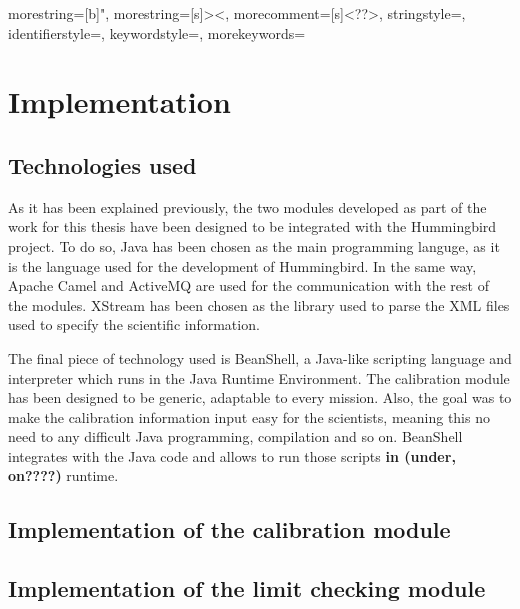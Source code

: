 


{
  morestring=[b]",
  morestring=[s]{>}{<},
  morecomment=[s]{<?}{?>},
  stringstyle=\color{black},
  identifierstyle=\color{darkblue},
  keywordstyle=\color{cyan},
  morekeywords={}%
}

\chapter{Implementation}

\section{Technologies used}

As it has been explained previously, the two modules developed as part of the work for this thesis have been designed to be integrated with the Hummingbird project. To do so, Java\cite{Java} has been chosen as the main programming languge, as it is the language used for the development of Hummingbird. In the same way, Apache Camel\cite{Camel} and ActiveMQ \cite{AMQ} are used for the communication with the rest of the modules. XStream\cite{XStream} has been chosen as the library used to parse the XML files used to specify the scientific information.

The final piece of technology used is BeanShell\citep{BSH}, a Java-like scripting language and interpreter which runs in the Java Runtime Environment. The calibration module has been designed to be generic, adaptable to every mission. Also, the goal was to make the calibration information input easy for the scientists, meaning this no need to any difficult Java programming, compilation and so on. BeanShell integrates with the Java code and allows to run those scripts \textbf{in (under, on????)} runtime.

\section{Implementation of the calibration module}

\section{Implementation of the limit checking module}


